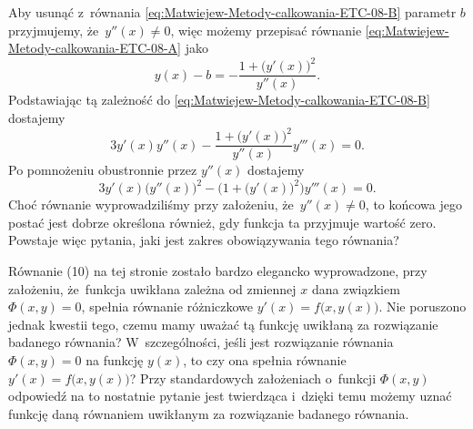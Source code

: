 \documentclass[a4paper,11pt]{article}
\begin{document}
\noindent
Aby usunąć z~równania \eqref{eq:Matwiejew-Metody-calkowania-ETC-08-B}
parametr $b$ przyjmujemy, że~$y''( x ) \neq 0$, więc możemy przepisać równanie
\eqref{eq:Matwiejew-Metody-calkowania-ETC-08-A} jako
\begin{equation}
  \label{eq:Matwiejew-Metody-calkowania-ETC-09}
  y( x ) - b =
  -\frac{ 1 + \big( y'( x ) \big)^{ 2 } }{ y''( x ) }.
\end{equation}
Podstawiając tą zależność do \eqref{eq:Matwiejew-Metody-calkowania-ETC-08-B}
dostajemy
\begin{equation}
  \label{eq:Matwiejew-Metody-calkowania-ETC-10}
  3 y'( x ) y''( x ) -
  \frac{ 1 + \big( y'( x ) \big)^{ 2 } }{ y''( x ) } y'''( x ) = 0.
\end{equation}
Po pomnożeniu obustronnie przez $y''( x )$ dostajemy
\begin{equation}
  \label{eq:Matwiejew-Metody-calkowania-ETC-11}
  3 y'( x ) \big( y''( x ) \big)^{ 2 } -
  \Big( 1 + \big( y'( x ) \big)^{ 2 } \Big) y'''( x ) = 0.
\end{equation}
Choć równanie wyprowadziliśmy przy założeniu, że~$y''( x ) \neq 0$, to końcowa
jego postać jest dobrze określona również, gdy funkcja ta przyjmuje wartość
zero. Powstaje więc pytania, jaki jest zakres obowiązywania tego równania?



\vspace{\VerSpaceFour}





\noindent
{} Równanie (10) na tej stronie zostało bardzo elegancko wyprowadzone,
przy założeniu, że~funkcja uwikłana zależna od zmiennej $x$ dana związkiem
$\Phi( x, y ) = 0$, spełnia równanie różniczkowe
$y'( x ) = f\big( x, y( x ) \big)$. Nie poruszono jednak kwestii tego, czemu
mamy uważać tą funkcję uwikłaną za rozwiązanie badanego równania?
W~szczególności, jeśli jest rozwiązanie równania $\Phi( x, y ) = 0$ na funkcję
$y( x )$, to czy ona spełnia równanie $y'( x ) = f\big( x, y( x ) \big)$?
Przy standardowych założeniach o~funkcji $\Phi( x, y )$ odpowiedź na to
nostatnie pytanie jest twierdząca i~dzięki temu możemy uznać funkcję daną
równaniem uwikłanym za rozwiązanie badanego równania.
\end{document}
